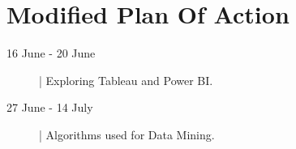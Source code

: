 \section*{ Modified Plan Of Action}

\vspace{2em}

\begin{description}
\item [16 June - 20 June]  |  Exploring Tableau and Power BI.
\item [27 June - 14 July]  |  Algorithms used for Data Mining.
\end{description}